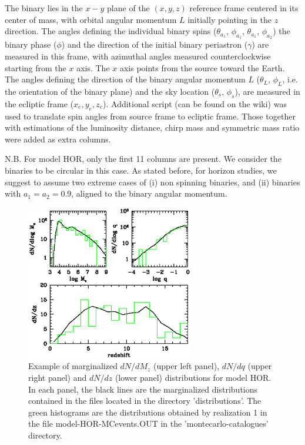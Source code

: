 \documentclass{iopart}
\begin{document}
The binary lies in the $x-y$ plane of the $(x,y,z)$ reference frame 
centered in its center of mass, with orbital angular momentum $L$ 
initially pointing in the $z$ direction. The angles defining the 
individual binary spins ($\theta_{a_{1}}$, $\phi_{a_{1}}$, $\theta_{a_{1}}$, 
$\phi_{a_{2}}$) the binary phase ($\phi$) and the direction of the
initial binary periastron ($\gamma$) are measured in this frame,
with azimuthal angles measured counterclockwise starting from 
the $x$ axis. The $x$ axis points from the source toward the Earth.
The angles defining the direction of the binary angular momentum $L$
($\theta_L$, $\phi_L$, i.e. the orientation of the binary plane)
and the sky location ($\theta_s$, $\phi_s$), are measured in the 
ecliptic frame ($x_e,y_e,z_e$). 
Additional script (can be found on the  wiki) was used to translate spin angles from 
source frame to ecliptic frame. Those together with estimations of the luminosity distance,
chirp mass and symmetric mass ratio were added as extra columns. 


N.B. For model  HOR, only the first 11 columns are present. We consider the binaries to be circular in this case. As stated before, for horizon
studies, we suggest to assume two extreme cases of (i) non spinning binaries,
and (ii) binaries with $a_1=a_2=0.9$, aligned to the binary angular momentum.

\begin{figure}[H]
\center
   \includegraphics[width=0.65\textwidth]{FigSMBHModSel/FIG_EXAMPLE_POP.eps}
\caption{Example of marginalized $dN/dM_z$ (upper left panel), $dN/dq$ (upper right panel) and $dN/dz$ (lower panel) distributions for model HOR. In each panel, the black lines are the marginalized distributions contained in the files located in the directory 'distributions'. The green histograms are the distributions obtained by realization 1 in the file model-HOR-MCevents.OUT in the 'montecarlo-catalogues' directory.
\label{F:MBHbMod:fig1} }
\end{figure}
\end{document}
